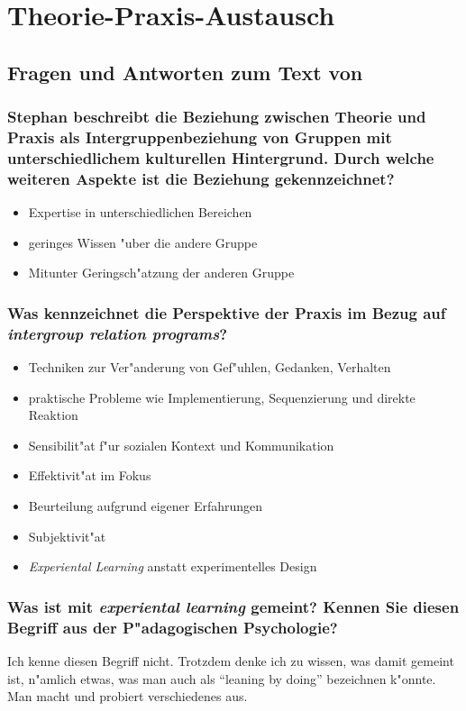 \section{Theorie-Praxis-Austausch}
\subsection{Fragen und Antworten zum Text von \textcite{stephan_bridging_2006}}
\subsubsection{Stephan beschreibt die Beziehung zwischen Theorie und Praxis als Intergruppenbeziehung von Gruppen mit unterschiedlichem kulturellen Hintergrund. Durch welche weiteren Aspekte ist die Beziehung gekennzeichnet?}
\begin{itemize}
        \item Expertise in unterschiedlichen Bereichen
        \item geringes Wissen "uber die andere Gruppe
        \item Mitunter Geringsch"atzung der anderen Gruppe
\end{itemize}

\subsubsection{Was kennzeichnet die Perspektive der Praxis im Bezug auf \emph{intergroup relation programs}?}
\begin{itemize}
        \item Techniken zur Ver"anderung von Gef"uhlen, Gedanken, Verhalten
        \item praktische Probleme wie Implementierung, Sequenzierung und direkte Reaktion
        \item Sensibilit"at f"ur sozialen Kontext und Kommunikation
        \item Effektivit"at im Fokus
        \item Beurteilung aufgrund eigener Erfahrungen
        \item Subjektivit"at
        \item \emph{Experiental Learning} anstatt experimentelles Design
\end{itemize}

\subsubsection{Was ist mit \emph{experiental learning} gemeint? Kennen Sie diesen Begriff aus der P"adagogischen Psychologie?}
Ich kenne diesen Begriff nicht. Trotzdem denke ich zu wissen, was damit gemeint ist, n"amlich etwas, was man auch als ``leaning by doing'' bezeichnen k"onnte. Man macht und probiert verschiedenes aus.

